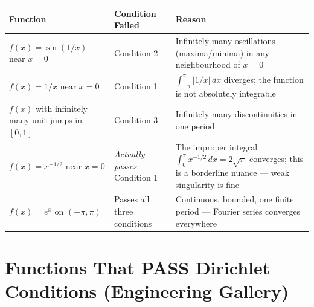 \documentclass[12pt,a4paper]{article}
\begin{document}
\begin{center}
\begin{tabular}{@{}p{4.5cm}p{4.5cm}p{5cm}@{}}
\toprule
\textbf{Function} & \textbf{Condition Failed} & \textbf{Reason} \\
\midrule
$f(x) = \sin(1/x)$ near $x=0$
  & Condition 2
  & Infinitely many oscillations (maxima/minima) in any neighbourhood of $x=0$ \\
\midrule
$f(x) = 1/x$ near $x=0$
  & Condition 1
  & $\int_{-\pi}^{\pi}|1/x|\,dx$ diverges; the function is not absolutely integrable \\
\midrule
$f(x)$ with infinitely many unit jumps in $[0,1]$
  & Condition 3
  & Infinitely many discontinuities in one period \\
\midrule
$f(x) = x^{-1/2}$ near $x=0$
  & \emph{Actually passes} Condition 1
  & The improper integral $\int_0^{\pi} x^{-1/2}\,dx = 2\sqrt{\pi}$ converges; this is a borderline nuance --- weak singularity is fine \\
\midrule
$f(x) = e^x$ on $(-\pi, \pi)$
  & Passes all three conditions
  & Continuous, bounded, one finite period --- Fourier series converges everywhere \\
\bottomrule
\end{tabular}
\end{center}

\section{Functions That PASS Dirichlet Conditions (Engineering Gallery)}
\end{document}
